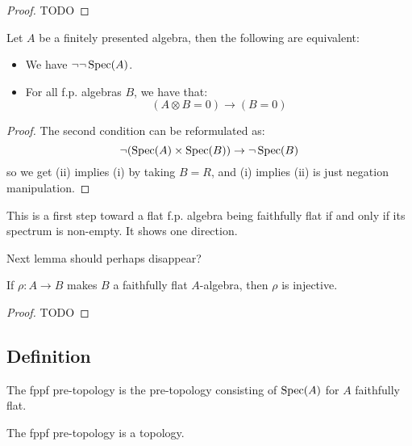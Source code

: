 \begin{proof}
TODO
\end{proof}

\begin{lemma}
Let $A$ be a finitely presented algebra, then the following are equivalent:
\begin{itemize}[(i)]
\item We have $\neg\neg\operatorname{Spec}(A)$.
\item For all f.p. algebras $B$, we have that:
\[(A\otimes B = 0) \to (B=0)\]
\end{itemize}
\end{lemma}

\begin{proof}
The second condition can be reformulated as:
\[\neg(\operatorname{Spec}(A)\times\operatorname{Spec}(B))\to \neg\operatorname{Spec}(B)\]
so we get (ii) implies (i) by taking $B=R$, and (i) implies (ii) is just negation manipulation.
\end{proof}

This is a first step toward a flat f.p. algebra being faithfully flat if and only if its spectrum is non-empty. It shows one direction.

Next lemma should perhaps disappear?

\begin{lemma}
If $\rho: A\to B$ makes $B$ a faithfully flat $A$-algebra, then $\rho$ is injective.
\end{lemma}

\begin{proof}
TODO
\end{proof}

\subsection{Definition}

\begin{definition}
The fppf pre-topology is the pre-topology consisting of $\operatorname{Spec}(A)$ for $A$ faithfully flat.
\end{definition}

\begin{lemma}
The fppf pre-topology is a topology.
\end{lemma}

